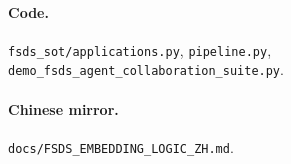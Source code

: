 \documentclass[11pt]{article}
\begin{document}
\paragraph{Code.}
\texttt{fsds\_sot/applications.py}, \texttt{pipeline.py}, \texttt{demo\_fsds\_agent\_collaboration\_suite.py}.

\paragraph{Chinese mirror.}
\texttt{docs/FSDS\_EMBEDDING\_LOGIC\_ZH.md}.
\end{document}
